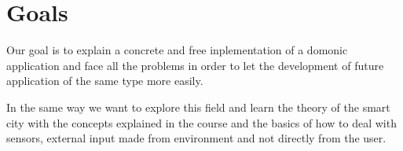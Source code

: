\section{Goals}

Our goal is to explain a concrete and free inplementation of a domonic application and face all the problems in order to let the development of future application of the same type more easily.

In the same way we want to explore this field and learn the theory of the smart city with the concepts explained in the course and the basics of how to deal with sensors, external input made from environment and not directly from the user.

\newpage


